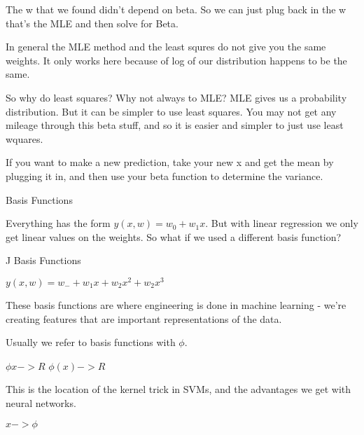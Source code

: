 \documentclass[12pt]{article}
\begin{document}
\begin{enumerate}
The w that we found didn't depend on beta. So we can just plug back in the w that's the MLE and then solve for Beta. 

In general the MLE method and the least squres do not give you the same weights. It only works here because of log of our distribution happens to be the same. 

So why do least squares? Why not always to MLE? MLE gives us a probability distribution. But it can be simpler to use least squares. You may not get any mileage through this beta stuff, and so it is easier and simpler to just use least wquares. 

If you want to make a new prediction, take your new x and get the mean by plugging it in, and then use your beta function to determine the variance. 

\begin{center}
Basis Functions
\end{center}

Everything has the form $y(x,w) = w_{0} + w_{1}x$. But with linear regression we only get linear values on the weights. So what if we used a different basis function?

J Basis Functions

$y(x,w) = w_{-} + w_{1}x + w_{2}x^{2}+w_{2}x^{3}$

These basis functions are where engineering is done in machine learning - we're creating features that are important representations of the data.

Usually we refer to basis functions with $\phi$.

$\phi x -> R$
$\phi (x) -> R$

This is the location of the kernel trick in SVMs, and the advantages we get with neural networks. 

$x->\phi$
\end{enumerate}
\end{document}
